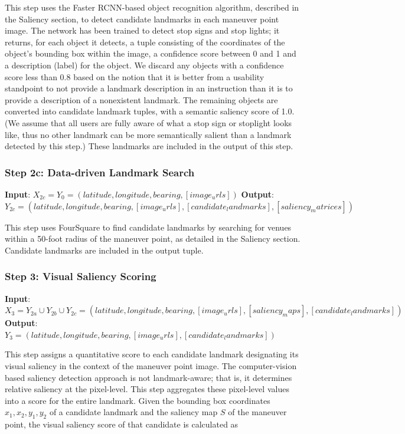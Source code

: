 This step uses the Faster RCNN-based object recognition algorithm, described in the Saliency section, to detect candidate landmarks in each maneuver point image. The network has been trained to detect stop signs and stop lights; it returns, for each object it detects, a tuple consisting of the coordinates of the object’s bounding box within the image, a confidence score between 0 and 1 and a description (label) for the object. We discard any objects with a confidence score less than 0.8 based on the notion that it is better from a usability standpoint to not provide a landmark description in an instruction than it is to provide a description of a nonexistent landmark. The remaining objects are converted into candidate landmark tuples, with a semantic saliency score of 1.0. (We assume that all users are fully aware of what a stop sign or stoplight looks like, thus no other landmark can be more semantically salient than a landmark detected by this step.) These landmarks are included in the output of this step.

\subsubsection*{Step 2c: Data-driven Landmark Search}
\textbf{Input}: $X_{2c} = Y_0 = (latitude, longitude, bearing, [image_urls])$
\textbf{Output}: $Y_{2c} = (latitude, longitude, bearing,  [image_urls], [candidate_landmarks], [saliency_matrices] )$ 

This step uses FourSquare to find candidate landmarks by searching for venues within a 50-foot radius of the maneuver point, as detailed in the Saliency section. Candidate landmarks are included in the output tuple.

\subsubsection*{Step 3: Visual Saliency Scoring}

\textbf{Input}: $X_3 = Y_{2a} \cup Y_{2b} \cup Y_{2c} = (latitude, longitude, bearing,  [image_urls], [saliency_maps], [candidate_landmarks] )$
\textbf{Output}: $Y_3 = (latitude, longitude, bearing,  [image_urls], [candidate_landmarks] )$ 

This step assigns a quantitative score to each candidate landmark designating its visual saliency in the context of the maneuver point image. The computer-vision based saliency detection approach is not landmark-aware; that is, it determines relative saliency at the pixel-level. This step aggregates these pixel-level values into a score for the entire landmark. Given the bounding box coordinates $x_1, x_2, y_1,y_2$ of a candidate landmark and the saliency map $S$ of the maneuver point, the visual saliency score of that candidate is calculated as

